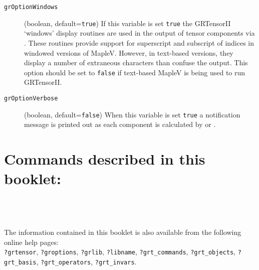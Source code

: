 \documentclass{article}
\begin{document}
\begin{description}
  \item[\texttt{grOptionWindows}] (boolean, default=\texttt{true}) If
    this variable is set \texttt{true} the GRTensorII `windows'
    display routines are used in the output of tensor components via
    . These routines provide support for superscript
    and subscript of indices in windowed versions of MapleV. However,
    in text-based versions, they display a number of extraneous
    characters than confuse the output. This option should be set to
    \texttt{false} if text-based MapleV is being used to run
    GRTensorII.

  \item[\texttt{grOptionVerbose}] (boolean, default=\texttt{false})
    When this variable is set \texttt{true} a notification message is
    printed out as each component is calculated by  or
    .
\end{description}
%
\vfill
%
%
\pagebreak
\section*{Commands described in this booklet:}
  \noindent
   \dotfill \pageref{spec:grlib}\\

  \noindent
   \dotfill \pageref{spec:grtensor}\\

  \noindent
   \dotfill \pageref{spec:groptions}\\
%
\vfill
\large
\noindent The information contained in this booklet is also available from the
following online help pages:\\

\noindent\texttt{?grtensor}, \texttt{?groptions}, \texttt{?grlib},
\texttt{?libname}, \texttt{?grt\_commands}, \texttt{?grt\_objects},
\texttt{?grt\_basis}, \texttt{?grt\_operators}, \texttt{?grt\_invars}.
%
\end{document}
